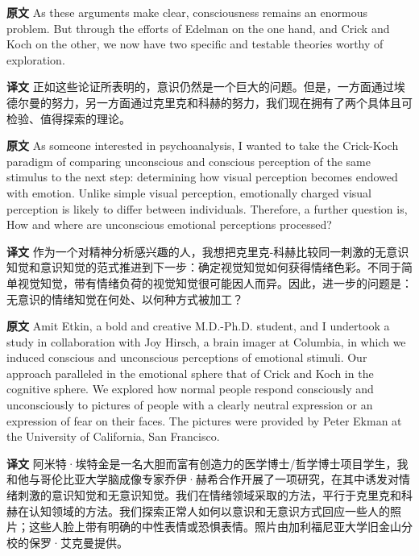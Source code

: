 \documentclass[UTF8,zihao=-4]{ctexart}
\newcommand{\BodyFont}{\fontsize{10.5pt}{15.5pt}\selectfont}
\newcommand{\origlabel}{\textbf{原文}\quad}
\newcommand{\translabel}{\textbf{译文}\quad}
\newenvironment{enblock}{\par\noindent\begingroup\BodyFont\origlabel}{\par\endgroup}
\newenvironment{zhblock}{\par\noindent\begingroup\BodyFont\translabel}{\par\endgroup\vspace{0.35em}}
\begin{document}
\begin{enblock}
As these arguments make clear, consciousness remains an enormous problem. But through the efforts of Edelman on the one hand, and Crick and Koch on the other, we now have two specific and testable theories worthy of exploration.
\end{enblock}
\begin{zhblock}
正如这些论证所表明的，意识仍然是一个巨大的问题。但是，一方面通过埃德尔曼的努力，另一方面通过克里克和科赫的努力，我们现在拥有了两个具体且可检验、值得探索的理论。\end{zhblock}

\begin{enblock}
As someone interested in psychoanalysis, I wanted to take the Crick-Koch paradigm of comparing unconscious and conscious perception of the same stimulus to the next step: determining how visual perception becomes endowed with emotion. Unlike simple visual perception, emotionally charged visual perception is likely to differ between individuals. Therefore, a further question is, How and where are unconscious emotional perceptions processed?
\end{enblock}
\begin{zhblock}
作为一个对精神分析感兴趣的人，我想把克里克-科赫比较同一刺激的无意识知觉和意识知觉的范式推进到下一步：确定视觉知觉如何获得情绪色彩。不同于简单视觉知觉，带有情绪负荷的视觉知觉很可能因人而异。因此，进一步的问题是：无意识的情绪知觉在何处、以何种方式被加工？
\end{zhblock}

\begin{enblock}
Amit Etkin, a bold and creative M.D.-Ph.D. student, and I undertook a study in collaboration with Joy Hirsch, a brain imager at Columbia, in which we induced conscious and unconscious perceptions of emotional stimuli. Our approach paralleled in the emotional sphere that of Crick and Koch in the cognitive sphere. We explored how normal people respond consciously and unconsciously to pictures of people with a clearly neutral expression or an expression of fear on their faces. The pictures were provided by Peter Ekman at the University of California, San Francisco.
\end{enblock}
\begin{zhblock}
阿米特·埃特金是一名大胆而富有创造力的医学博士/哲学博士项目学生，我和他与哥伦比亚大学脑成像专家乔伊·赫希合作开展了一项研究，在其中诱发对情绪刺激的意识知觉和无意识知觉。我们在情绪领域采取的方法，平行于克里克和科赫在认知领域的方法。我们探索正常人如何以意识和无意识方式回应一些人的照片；这些人脸上带有明确的中性表情或恐惧表情。照片由加利福尼亚大学旧金山分校的保罗·艾克曼提供。\end{zhblock}
\end{document}
